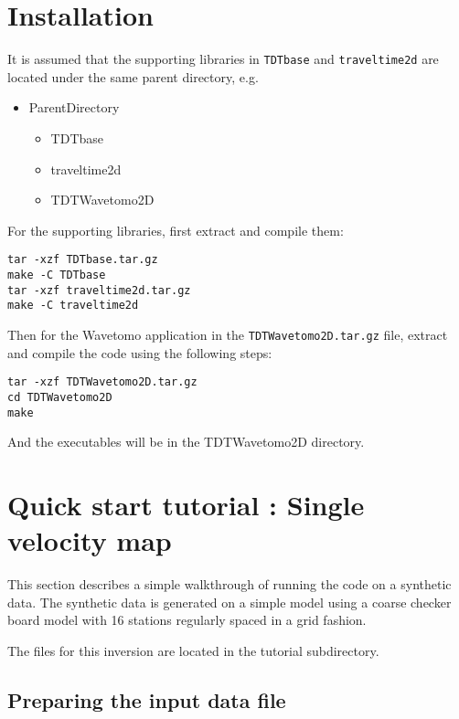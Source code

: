 \documentclass[a4paper,12pt]{article}
\begin{document}
\section{Installation}

It is assumed that the supporting libraries in {\tt TDTbase} and {\tt traveltime2d} are
located under the same parent directory, e.g.

\begin{itemize}
\item ParentDirectory
  \begin{itemize}
  \item TDTbase
  \item traveltime2d
  \item TDTWavetomo2D
  \end{itemize}
\end{itemize}

For the supporting libraries, first extract and compile them:

\begin{verbatim}
tar -xzf TDTbase.tar.gz
make -C TDTbase
tar -xzf traveltime2d.tar.gz
make -C traveltime2d
\end{verbatim}

Then for the Wavetomo application in the {\tt TDTWavetomo2D.tar.gz}
file, extract and compile the code using the following steps:

\begin{verbatim}
tar -xzf TDTWavetomo2D.tar.gz
cd TDTWavetomo2D
make
\end{verbatim}

And the executables will be in the TDTWavetomo2D directory.

\section{Quick start tutorial : Single velocity map}

This section describes a simple walkthrough of running the code on
a synthetic data. The synthetic data is generated on a simple
model using a coarse checker board model with 16 stations regularly
spaced in a grid fashion.

The files for this inversion are located in the tutorial subdirectory.

\subsection{Preparing the input data file}
\end{document}
